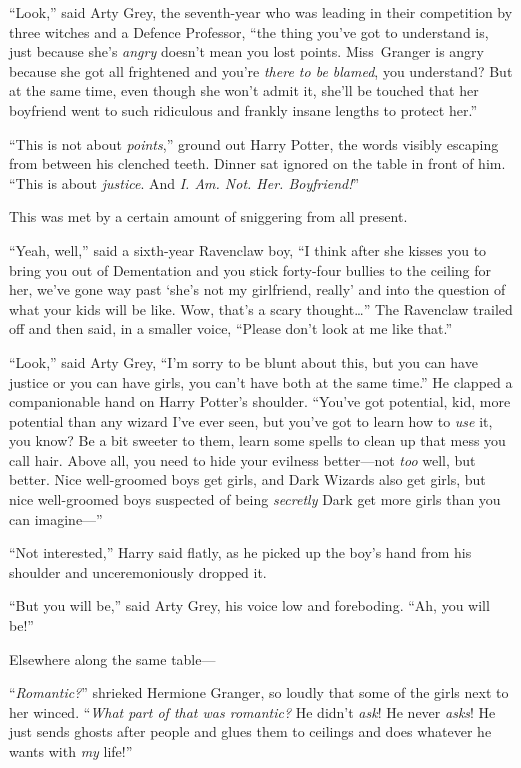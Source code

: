 “Look,” said Arty Grey, the seventh-year who was leading in their competition by three witches and a Defence Professor, “the thing you’ve got to understand is, just because she’s \emph{angry} doesn’t mean you lost points. Miss~Granger is angry because she got all frightened and you’re \emph{there to be blamed}, you understand? But at the same time, even though she won’t admit it, she’ll be touched that her boyfriend went to such ridiculous and frankly insane lengths to protect her.”

“This is not about \emph{points},” ground out Harry Potter, the words visibly escaping from between his clenched teeth. Dinner sat ignored on the table in front of him.
“This is about \emph{justice}. And \emph{I\@. Am. Not. Her. Boyfriend!}”

This was met by a certain amount of sniggering from all present.

“Yeah, well,” said a sixth-year Ravenclaw boy,
“I think after she kisses you to bring you out of Dementation and you stick forty-four bullies to the ceiling for her, we’ve gone way past ‘she’s not my girlfriend, really’ and into the question of what your kids will be like. Wow, that’s a scary thought…” The Ravenclaw trailed off and then said, in a smaller voice,
“Please don’t look at me like that.”

“Look,” said Arty Grey,
“I’m sorry to be blunt about this, but you can have justice or you can have girls, you can’t have both at the same time.” He clapped a companionable hand on Harry Potter’s shoulder.
“You’ve got potential, kid, more potential than any wizard I’ve ever seen, but you’ve got to learn how to \emph{use} it, you know? Be a bit sweeter to them, learn some spells to clean up that mess you call hair. Above all, you need to hide your evilness better—not \emph{too} well, but better. Nice well-groomed boys get girls, and Dark Wizards also get girls, but nice well-groomed boys suspected of being \emph{secretly} Dark get more girls than you can imagine—”

“Not interested,” Harry said flatly, as he picked up the boy’s hand from his shoulder and unceremoniously dropped it.

“But you will be,” said Arty Grey, his voice low and foreboding.
“Ah, you will be!”

Elsewhere along the same table—

“\emph{Romantic?}” shrieked Hermione Granger, so loudly that some of the girls next to her winced. “\emph{What part of that was romantic?} He didn’t \emph{ask}! He never \emph{asks}! He just sends ghosts after people and glues them to ceilings and does whatever he wants with \emph{my} life!”

